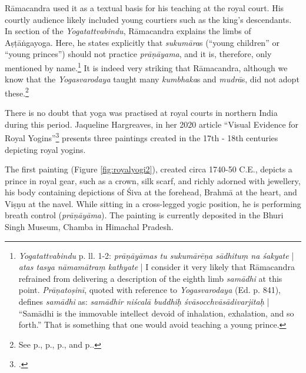 Rāmacandra used it as a textual basis for his teaching at the royal court. His courtly audience likely included young courtiers such as the king's descendants. In section  of the \emph{Yogatattvabindu}, Rāmacandra explains the limbs of Aṣṭāṅgayoga. Here, he states explicitly that \textit{sukumāra}s (``young children'' or ``young princes'') should not practice \textit{prāṇāyama}, and it is, therefore, only mentioned by name.\footnote{\emph{Yogatattvabindu}  p.\pageref{sukumara} ll. 1-2: \textit{prāṇāyāmas tu sukumārēṇa sādhituṃ na śakyate} | \textit{atas tasya nāmamātraṃ kathyate} | I consider it very likely that Rāmacandra refrained from delivering a description of the eighth limb \textit{samādhi} at this point. \emph{Prāṇatoṣinī}, quoted with reference to \emph{Yogasvarodaya} (Ed. p. 841), defines \textit{samādhi} as: \textit{samādhir niścalā buddhiḥ śvāsocchvāsādivarjitaḥ} | ``Samādhi is the immovable intellect devoid of inhalation, exhalation, and so forth.'' That is something that one would avoid teaching a young prince.} It is indeed very striking that Rāmacandra, although we know that the \emph{Yogasvarodaya} taught many \textit{kumbhaka}s and \textit{mudrā}s, did not adopt these.\footnote{See p.\pageref{svaro}, p.\pageref{tosi}, p.\pageref{karni}, and p.\pageref{yogasvarodayadescription}.} 

There is no doubt that yoga was practised at royal courts in northern India during this period. Jaqueline Hargreaves, in her 2020 article ``Visual Evidence for Royal Yogins''\footnote{\cite{hargreaves2020}.} presents three paintings created in the 17th - 18th centuries depicting royal yogins.

The first painting (Figure \ref{fig:royalyogi2}), created circa 1740-50 C.E., depicts a prince in royal gear, such as a crown, silk scarf, and richly adorned with jewellery, his body containing depictions of Śiva at the forehead, Brahmā at the heart, and Viṣṇu at the navel. While sitting in a cross-legged yogic position, he is performing breath control (\textit{prāṇāyāma}). The painting is currently deposited in the Bhuri Singh Museum, Chamba in Himachal Pradesh.


